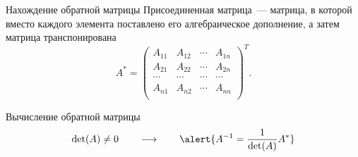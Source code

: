 \documentclass[unicode,11pt,notheorems]{beamer}
\begin{document}
\begin{frame}{Нахождение обратной матрицы}{}
\alert{Присоединенная матрица}~--- матрица, в которой вместо каждого элемента поставлено его алгебраическое дополнение, а затем матрица транспонирована
$$
A^*=\begin{pmatrix}
A_{11} & A_{12} & \cdots & A_{1n}\\
A_{21} & A_{22} & \cdots & A_{2n}\\
\cdots & \cdots & \cdots & \cdots\\
A_{n1} & A_{n2} & \cdots & A_{nn}\\
\end{pmatrix}^T.
$$

\begin{block}{Вычисление обратной матрицы}
$$
	\det(A) \neq 0 \qquad\longrightarrow\qquad	\alert{A^{-1}=\frac{1}{\det(A)}A^*}
$$
\end{block}
\end{frame}
\end{document}
